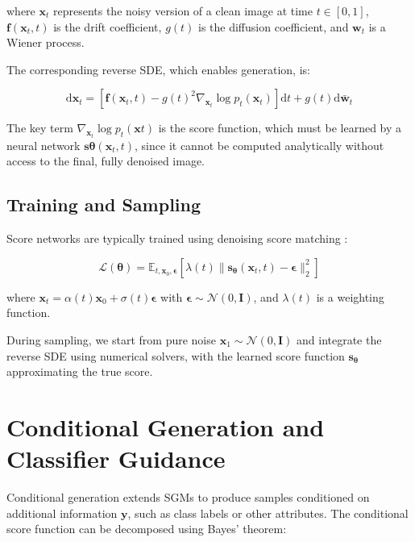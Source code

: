 \documentclass[licencjacka,en]{pracamgr}
\newcommand{\diff}{\mathrm{d}}
\begin{document}
where $\mathbf{x}_t$ represents the noisy version of a clean image at time $t \in [0, 1]$, $\mathbf{f}(\mathbf{x}_t, t)$ is the drift coefficient, $g(t)$ is the diffusion coefficient, and $\mathbf{w}_t$ is a Wiener process.

The corresponding reverse SDE, which enables generation, is:

\begin{equation}
\diff \mathbf{x}_t = [\mathbf{f}(\mathbf{x}_t, t) - g(t)^2 \nabla_{\mathbf{x}_t} \log p_t(\mathbf{x}_t)] \diff t + g(t) \diff \bar{\mathbf{w}}_t
\label{eq:reverse_sde}
\end{equation}

The key term $\nabla_{\mathbf{x}_t} \log p_t(\mathbf{x}t)$ is the score function, which must be learned by a neural network $\mathbf{s}{\boldsymbol{\theta}}(\mathbf{x}_t, t)$, since it cannot be computed analytically without access to the final, fully denoised image.

\subsection{Training and Sampling}

Score networks are typically trained using denoising score matching \citep{6795935, song2020generativemodelingestimatinggradients}:

\begin{equation}
\mathcal{L}(\boldsymbol{\theta}) = \mathbb{E}_{t, \mathbf{x}_0, \boldsymbol{\epsilon}} \left[ \lambda(t) \|\mathbf{s}_{\boldsymbol{\theta}}(\mathbf{x}_t, t) - \boldsymbol{\epsilon}\|_2^2 \right]
\label{eq:score_matching_loss}
\end{equation}

where $\mathbf{x}_t = \alpha(t)\mathbf{x}_0 + \sigma(t)\boldsymbol{\epsilon}$ with $\boldsymbol{\epsilon} \sim \mathcal{N}(0, \mathbf{I})$, and $\lambda(t)$ is a weighting function.

During sampling, we start from pure noise $\mathbf{x}_1 \sim \mathcal{N}(0, \mathbf{I})$ and integrate the reverse SDE using numerical solvers, with the learned score function $\mathbf{s}_{\boldsymbol{\theta}}$ approximating the true score.

\section{Conditional Generation and Classifier Guidance}

Conditional generation extends SGMs to produce samples conditioned on additional information $\mathbf{y}$, such as class labels or other attributes. The conditional score function can be decomposed using Bayes' theorem:
\end{document}
